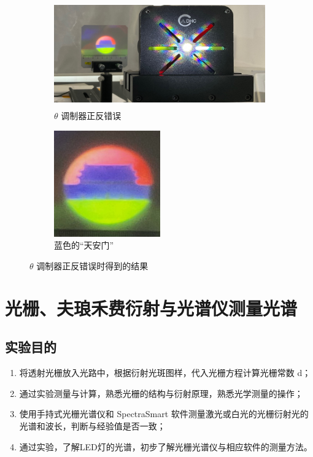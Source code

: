 \documentclass[UTF8]{article}
\theoremstyle{MyLineTheoremStyle} %
\theoremstyle{MyBlockTheoremStyle} %
\theoremstyle{MySubsubsectionStyle} %
\begin{document}
\begin{figure}[H]\centering
\begin{subfigure}[b]{0.66\columnwidth}\centering
    \includegraphics[height=130pt]{assets/3 假彩编码/天安门 蓝色 实验台.jpg}
    \caption{$\theta$ 调制器正反错误}
\end{subfigure}\hfill
\begin{subfigure}[b]{0.33\columnwidth}\centering
    \includegraphics[height=130pt]{assets/3 假彩编码/天安门 蓝色.jpg}
    \caption{蓝色的“天安门”}
\end{subfigure}
\caption{$\theta$ 调制器正反错误时得到的结果}
\label{调制器正反错误}
\end{figure}



\section{光栅、夫琅禾费衍射与光谱仪测量光谱}

\subsection{实验目的}

\begin{enumerate}
\item 将透射光栅放入光路中，根据衍射光斑图样，代入光栅方程计算光栅常数 d；
\item 通过实验测量与计算，熟悉光栅的结构与衍射原理，熟悉光学测量的操作；
\item 使用手持式光栅光谱仪和 SpectraSmart 软件测量激光或白光的光栅衍射光的光谱和波长，判断与经验值是否一致；
\item 通过实验，了解LED灯的光谱，初步了解光栅光谱仪与相应软件的测量方法。
\end{enumerate}
\end{document}
